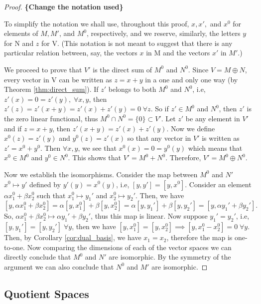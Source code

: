 \documentclass[10pt,a4paper]{article}
\begin{document}
\begin{proof}
    \textbf{\{Change the notation used\}}
    
    To simplify the notation we shall use, throughout this proof, $x, x',$ and $x^0$ for elements of $M,M'$, and $M^0$, respectively, and we reserve, similarly, the letters $y$ for N and $z$ for V. (This notation is not meant to suggest that there is any particular relation between, say, the vectors $x$ in M and the vectors $x'$ in $M'$.)

    We proceed to prove that $V'$ is the direct sum of $M^0$ and $N^0$. Since $V=M\oplus N$, every vector in V can be written as $z=x+y$ in a one and only one way (by Theorem \ref{thm:direct_sum}). If $z'$ belongs to both $M^0$ and $N^0$, i.e, $z'(x)=0=z'(y),\;\forall x,y$, then $z'(z)=z'(x+y)=z'(x)+z'(y)=0\;\forall z$. So if $z'\in M^0$ and $N^0$, then $z'$ is the zero linear functional, thus $M^0\cap N^0=\{0\}\subset V'$.
    Let $z'$ be any element in $V'$ and if $z=x+y$, then $z'(x+y)=z'(x)+z'(y)$. Now we define $x^0(z)=z'(y)$ and $y^0(z)=z'(x)$ so that any vector in $V'$ is written as $z'=x^0+y^0$. Then $\forall x,y$, we see that $x^0(x)=0=y^0(y)$ which means that $x^0\in M^0$ and $y^0\in N^0$. This shows that $V'=M^0+N^0$. Therefore, $V'=M^0\oplus N^0$.
    
    Now we establish the isomorphisms. Consider the map between $M^0$ and $N'$ $x^0\mapsto y'$ defined by $y'(y)=x^0(y)$, i.e, $[y,y']=[y,x^0]$. Consider an element $\alpha x_1^0+\beta x_2^0$ such that $x_1^0\mapsto y_1'$ and $x_2^0\mapsto y_2'$. Then, we have
    $$
        [y,\alpha x_1^0+\beta x_2^0] = \alpha [y,x_1^0]+\beta [y,x_2^0] = \alpha [y,y_1']+\beta [y,y_2'] = [y,\alpha y_1'+\beta y_2'].
    $$
    So, $\alpha x_1^0+\beta x_2^0\mapsto \alpha y_1'+\beta y_2'$, thus this map is linear. Now suppose $y_1'=y_2'$, i.e, $[y,y_1']=[y,y_2']\;\forall y$, then we have $[y,x_1^0] = [y,x_2^0]\implies [y,x_1^0-x_2^0]=0\;\forall y$. Then, by Corollary \ref{cor:dual_basis}, we have $x_1=x_2$, therefore the map is one-to-one. Now comparing the dimensions of each of the vector spaces we can directly conclude that $M^0$ and $N'$ are isomorphic. By the symmetry of the argument we can also conclude that $N^0$ and $M'$ are isomorphic.
\end{proof}


\subsection{Quotient Spaces}
\end{document}
